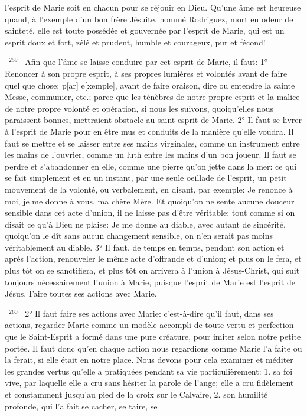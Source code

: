 \documentclass[paper=a5,pagesize=pdftex,fontsize=15pt,headinclude=on,twoside=off]{scrbook}
\newcommand{\negphantom}[1]{\settowidth{\dimen0}{#1}\hspace*{-\dimen0}}
\newcommand{\versenb}[1]{\par \vspace{10pt}~\negphantom{~${}^{#1}$~}${}^{#1}$~}
\begin{document}
l'esprit de Marie soit en chacun pour se réjouir en Dieu. Qu'une âme est heureuse quand, à l'exemple d'un bon
frère Jésuite, nommé Rodriguez, mort en odeur de sainteté, elle est toute possédée et gouvernée par l'esprit de
Marie, qui est un esprit doux et fort, zélé et prudent, humble et courageux, pur et fécond!
\versenb{259} Afin que l'âme se laisse conduire par cet esprit de Marie, il faut: 1° Renoncer à son propre esprit, à ses
propres lumières et volontés avant de faire quel que chose: p[ar] e[xemple], avant de faire oraison, dire ou
entendre la sainte Messe, communier, etc.; parce que les ténèbres de notre propre esprit et la malice de notre
propre volonté et opération, si nous les suivons, quoiqu'elles nous paraissent bonnes, mettraient obstacle au saint
esprit de Marie. 2° Il faut se livrer à l'esprit de Marie pour en être mus et conduits de la manière qu'elle voudra. Il
faut se mettre et se laisser entre ses mains virginales, comme un instrument entre les mains de l'ouvrier, comme
un luth entre les mains d'un bon joueur. Il faut se perdre et s'abandonner en elle, comme une pierre qu'on jette
dans la mer: ce qui se fait simplement et en un instant, par une seule oeillade de l'esprit, un petit mouvement de la
volonté, ou verbalement, en disant, par exemple: Je renonce à moi, je me donne à vous, ma chère Mère. Et
quoiqu'on ne sente aucune douceur sensible dans cet acte d'union, il ne laisse pas d'être véritable: tout comme si
on disait ce qu'à Dieu ne plaise: Je me donne au diable, avec autant de sincérité, quoiqu'on le dît sans aucun
changement sensible, on n'en serait pas moins véritablement au diable. 3° Il faut, de temps en temps, pendant son
action et après l'action, renouveler le même acte d'offrande et d'union; et plus on le fera, et plus tôt on se
sanctifiera, et plus tôt on arrivera à l'union à Jésus-Christ, qui suit toujours nécessairement l'union à Marie, puisque
l'esprit de Marie est l'esprit de Jésus.
Faire toutes ses actions avec Marie.
\versenb{260} 2° Il faut faire ses actions avec Marie: c'est-à-dire qu'il faut, dans ses actions, regarder Marie comme un
modèle accompli de toute vertu et perfection que le Saint-Esprit a formé dans une pure créature, pour imiter selon
notre petite portée. Il faut donc qu'en chaque action nous regardions comme Marie l'a faite ou la ferait, si elle était
en notre place. Nous devons pour cela examiner et méditer les grandes vertus qu'elle a pratiquées pendant sa vie
particulièrement: 1. sa foi vive, par laquelle elle a cru sans hésiter la parole de l'ange; elle a cru fidèlement et
constamment jusqu'au pied de la croix sur le Calvaire, 2. son humilité profonde, qui l'a fait se cacher, se taire, se
\end{document}
